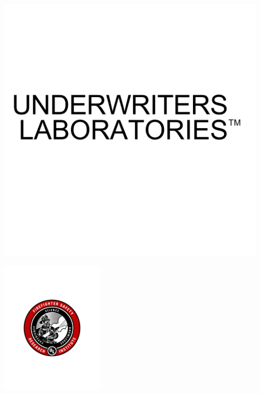 \documentclass[12pt,oneside]{book}
\begin{document}
\begin{minipage}[t][9in][s]{6.25in}
\begin{flushright}
\begin{minipage}{0.5\textwidth}
\includegraphics[width=\textwidth]{UnderwritersLaboratories_TM} \\ 
\end{minipage} \hfill
\begin{minipage}{0.25\textwidth}
\includegraphics[width=2.0in]{FSRI_GraphicShield} \\ 
\end{minipage}
\end{flushright}
\titlesigs

\scriptsize
{}
\end{minipage}
\end{document}

